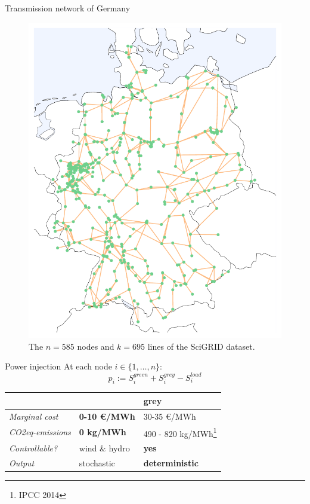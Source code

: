 \documentclass[10pt]{beamer}
\newcommand{\mel}[1]{\ensuremath{{{#1}}}}
\begin{document}
\begin{frame}{Transmission network of Germany}
    \begin{figure}
    \includegraphics[height=.69\paperheight]{img/just_the_network.pdf}
    \caption{The $n=585$ nodes and $k=695$ lines of the SciGRID dataset.}
    \end{figure}
\end{frame}

\begin{frame}{Power injection}
    At each node $i\in\{1,\dots,n\}$:
    \[\mel{p}_i := S^{green}_i + S^{grey}_i - S^{load}_i\]
    \begin{table}[]
\begin{tabular}{l|ll}
\toprule
                         & \color{renewablegreen}{\textbf{green}} & \textbf{\textbf{grey}} \\
                         \midrule
\emph{Marginal cost} & \textbf{0-10 €/MWh}       & 30-35 €/MWh      \\
\emph{CO2eq-emissions} & \textbf{0 kg/MWh}          & 490 - 820 kg/MWh\footnote{IPCC 2014} \\
\emph{Controllable?}   & wind \& hydro               & \textbf{yes}             \\
\emph{Output}          & stochastic       & \textbf{deterministic}\\
\bottomrule
\end{tabular}
\end{table}
\end{frame}
\end{document}
